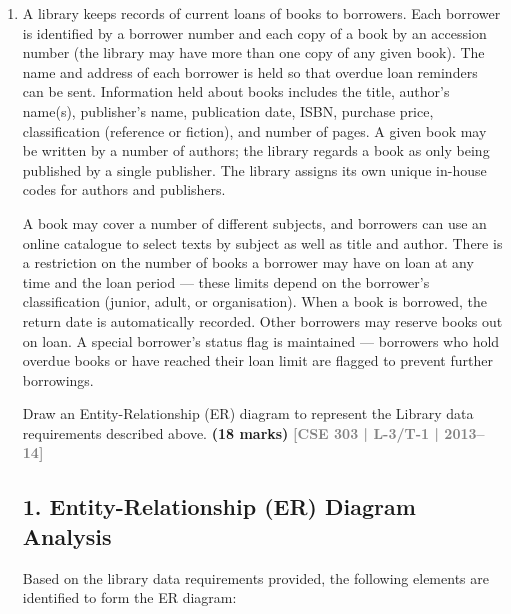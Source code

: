 \documentclass[12pt,a3paper]{article}
\newcommand{\yr}[1]{\hfill\textcolor{gray}{\small\textbf{[#1]}}}
\newcommand{\mk}[1]{\textcolor{orange!70!black}{\small\textbf{(#1 marks)}}}
\begin{document}
\begin{enumerate}
\item A library keeps records of current loans of books to borrowers. Each borrower is identified by a borrower number and each copy of a book by an accession number (the library may have more than one copy of any given book). The name and address of each borrower is held so that overdue loan reminders can be sent. Information held about books includes the title, author's name(s), publisher's name, publication date, ISBN, purchase price, classification (reference or fiction), and number of pages. A given book may be written by a number of authors; the library regards a book as only being published by a single publisher. The library assigns its own unique in-house codes for authors and publishers.

A book may cover a number of different subjects, and borrowers can use an online catalogue to select texts by subject as well as title and author. There is a restriction on the number of books a borrower may have on loan at any time and the loan period --- these limits depend on the borrower's classification (junior, adult, or organisation). When a book is borrowed, the return date is automatically recorded. Other borrowers may reserve books out on loan. A special borrower's status flag is maintained --- borrowers who hold overdue books or have reached their loan limit are flagged to prevent further borrowings.

Draw an Entity-Relationship (ER) diagram to represent the Library data requirements described above.
\mk{18} \yr{CSE 303 | L-3/T-1 | 2013--14}

\begin{tcolorbox}[enhanced,breakable,ansbox,colback=cA!4,colframe=cA,boxrule=0.8pt,arc=5pt,title={\textbf{Answer}},fonttitle=\bfseries\color{white},colbacktitle=cA]

\subsection*{1. Entity-Relationship (ER) Diagram Analysis}

Based on the library data requirements provided, the following elements are identified to form the ER diagram:


\end{tcolorbox}
\end{enumerate}
\end{document}
